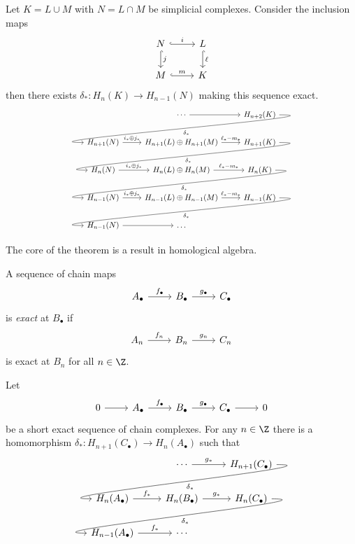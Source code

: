 \documentclass[a4paper]{article}
\begin{document}
\begin{theorem}
  \label{thm:Mayer-Vietoris}
  Let \(K = L \cup M\) with \(N = L \cap M\) be simplicial complexes. Consider the inclusion maps
  \[
    \begin{tikzcd}
      N \ar[r, hook, "i"] \ar[d, hook, "j"] & L \ar[d, hook, "\ell"] \\
      M \ar[r, hook, "m"] & K
    \end{tikzcd}
  \]
  then there exists \(\delta_*: H_n(K) \to H_{n - 1}(N)\) making this sequence exact.
  \[
    \begin{tikzcd}
      & \cdots \ar[r] & H_{n + 2}(K) \ar[dll, out=0, in=180, "\delta_*"] \\
      H_{n + 1}(N) \ar[r, "i_* \oplus j_*"] & H_{n + 1}(L) \oplus H_{n + 1}(M) \ar[r, "\ell_* - m_*"] & H_{n + 1}(K) \ar[dll, out=0, in=180, "\delta_*"] \\
      H_{n}(N) \ar[r, "i_* \oplus j_*"] & H_{n}(L) \oplus H_{n}(M) \ar[r, "\ell_* - m_*"] & H_n(K) \ar[dll, out=0, in=180, "\delta_*"] \\
      H_{n - 1}(N) \ar[r, "i_* \oplus j_*"] & H_{n - 1}(L) \oplus H_{n - 1}(M) \ar[r, "\ell_* - m_*"] & H_{n - 1}(K) \ar[dll, out=0, in=180, "\delta_*"] \\
      H_{n - 1}(N) \ar[r] & \dots
    \end{tikzcd}
  \]
\end{theorem}

The core of the theorem is a result in homological algebra.

\begin{definition}
  A sequence of chain maps
  \[
    \begin{tikzcd}
      A_\bullet \ar[r, "f_\bullet"] & B_\bullet \ar[r, "g_\bullet"] & C_\bullet 
    \end{tikzcd}
  \]
  is \emph{exact} at \(B_\bullet\) if
  \[
    \begin{tikzcd}
      A_n \ar[r, "f_n"] & B_n \ar[r, "g_n"] & C_n
    \end{tikzcd}
  \]
  is exact at \(B_n\) for all \(n \in \Z\).
\end{definition}

\begin{lemma}
  Let
  \[
    \begin{tikzcd}
      0 \ar[r] & A_\bullet \ar[r, "f_\bullet"] & B_\bullet \ar[r, "g_\bullet"] & C_\bullet \ar[r] & 0
    \end{tikzcd}
  \]
  be a short exact sequence of chain complexes. For any \(n \in \Z\) there is a homomorphism \(\delta_*: H_{n + 1}(C_\bullet) \to H_n(A_\bullet)\) such that
  \[
    \begin{tikzcd}
      & \cdots \ar[r, "g_*"] & H_{n + 1}(C_\bullet) \ar[dll, out=0, in=180, "\delta_*"] \\
      H_n(A_\bullet) \ar[r, "f_*"] & H_n(B_\bullet) \ar[r, "g_*"] & H_n(C_\bullet) \ar[dll, out=0, in=180, "\delta_*"] \\
      H_{n - 1}(A_\bullet) \ar[r, "f_*"] & \cdots
    \end{tikzcd}
  \]
\end{lemma}
\end{document}
